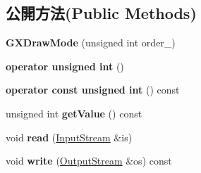 \subsection*{公開方法(Public Methods)}
\begin{DoxyCompactItemize}
\item 
{\bfseries G\+X\+Draw\+Mode} (unsigned int order\+\_)\hypertarget{class_magnum_1_1_g_x_draw_mode_a2408cfa77cd68aef9f1f5799a30deecc}{}\label{class_magnum_1_1_g_x_draw_mode_a2408cfa77cd68aef9f1f5799a30deecc}

\item 
{\bfseries operator unsigned int} ()\hypertarget{class_magnum_1_1_g_x_draw_mode_a739431891fec9fb9d7076b96756c5858}{}\label{class_magnum_1_1_g_x_draw_mode_a739431891fec9fb9d7076b96756c5858}

\item 
{\bfseries operator const unsigned int} () const \hypertarget{class_magnum_1_1_g_x_draw_mode_ada83205b8fa9e1f457b2b89587b8b198}{}\label{class_magnum_1_1_g_x_draw_mode_ada83205b8fa9e1f457b2b89587b8b198}

\item 
unsigned int {\bfseries get\+Value} () const \hypertarget{class_magnum_1_1_g_x_draw_mode_a228359225d6208566c0f5ff583149db4}{}\label{class_magnum_1_1_g_x_draw_mode_a228359225d6208566c0f5ff583149db4}

\item 
void {\bfseries read} (\hyperlink{class_magnum_1_1_input_stream}{Input\+Stream} \&is)\hypertarget{class_magnum_1_1_g_x_draw_mode_a903ce292ee545de55f4a5f9cd7ec73bf}{}\label{class_magnum_1_1_g_x_draw_mode_a903ce292ee545de55f4a5f9cd7ec73bf}

\item 
void {\bfseries write} (\hyperlink{class_magnum_1_1_output_stream}{Output\+Stream} \&os) const \hypertarget{class_magnum_1_1_g_x_draw_mode_a9c69525e7840f35d8de69ca62f9dd5c8}{}\label{class_magnum_1_1_g_x_draw_mode_a9c69525e7840f35d8de69ca62f9dd5c8}

\end{DoxyCompactItemize}
